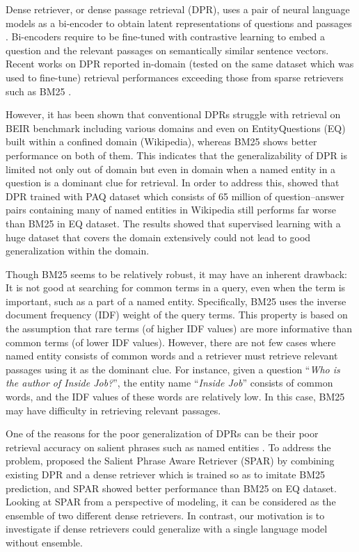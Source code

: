 \documentclass[letterpaper]{article} \usepackage{aaai23}  \usepackage{times}  \usepackage{helvet}  \usepackage{courier}  \usepackage[hyphens]{url}  \usepackage{graphicx} \urlstyle{rm} \def\UrlFont{\rm}  \usepackage{natbib}  \usepackage{caption} \frenchspacing  \setlength{\pdfpagewidth}{8.5in}  \setlength{\pdfpageheight}{11in}  \usepackage{algorithm}
\begin{document}
Dense retriever, or dense passage retrieval (DPR), uses a pair of neural language models as a bi-encoder to obtain latent representations of questions and passages \citep{lee-etal-2019-latent}.
Bi-encoders require to be fine-tuned with contrastive learning to embed a question and the relevant passages on semantically similar sentence vectors.
Recent works on DPR reported in-domain (tested on the same dataset which was used to fine-tune) retrieval performances exceeding those from sparse retrievers such as BM25 \citep{karpukhin-etal-2020-dense}.

However, it has been shown that conventional DPRs struggle with retrieval on BEIR benchmark \citep{thakur2021beir} including various domains and even on EntityQuestions (EQ) \citep{sciavolino-etal-2021-simple} built within a confined domain (Wikipedia), whereas BM25 shows better performance on both of them.
This indicates that the generalizability of DPR is limited not only out of domain but even in domain when a named entity in a question is a dominant clue for retrieval.
In order to address this, \citet{sciavolino-etal-2021-simple} showed that DPR trained with PAQ dataset \citep{lewis-etal-2021-paq} which consists of 65 million of question--answer pairs containing many of named entities in Wikipedia still performs far worse than BM25 in EQ dataset.
The results showed that supervised learning with a huge dataset that covers the domain extensively could not lead to good generalization within the domain.

Though BM25 seems to be relatively robust, it may have an inherent drawback:
It is not good at searching for common terms in a query, even when the term is important, such as a part of a named entity.
Specifically, BM25 uses the inverse document frequency (IDF) weight of the query terms.
This property is based on the assumption that rare terms (of higher IDF values) are more informative than common terms (of lower IDF values).
However, there are not few cases where named entity consists of common words and a retriever must retrieve relevant passages using it as the dominant clue.
For instance, given a question ``\textit{Who is the author of Inside Job?}'', the entity name ``\textit{Inside Job}'' consists of common words, and the IDF values of these words are relatively low.
In this case, BM25 may have difficulty in retrieving relevant passages.

One of the reasons for the poor generalization of DPRs can be their poor retrieval accuracy on salient phrases such as named entities \citep[e.g.,][]{karpukhin-etal-2020-dense}.
To address the problem, \citet{Chen2021SalientPA} proposed the Salient Phrase Aware Retriever (SPAR) by combining existing DPR and a dense retriever which is trained so as to imitate BM25 prediction, and SPAR showed better performance than BM25 on EQ dataset.
Looking at SPAR from a perspective of modeling, it can be considered as the ensemble of two different dense retrievers.
In contrast, our motivation is to investigate if dense retrievers could generalize with a single language model without ensemble.
\end{document}
